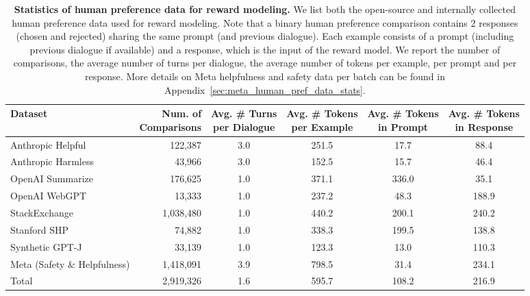 \documentclass{article}
\begin{document}
\begin{table}[ht]
  \centering
  \setlength{\tabcolsep}{4pt}
   {
  \begin{tabular}{@{}l@{\hspace*{0mm}}rcccc@{}}
    \toprule
     Dataset  & \shortstack[r]{Num. of \\ Comparisons} & \shortstack{ Avg. \# Turns \\ per Dialogue}  & \shortstack{Avg. \# Tokens \\ per Example} & \shortstack{Avg. \# Tokens \\in Prompt} & \shortstack{Avg. \# Tokens \\ in Response} \\
    \midrule
    Anthropic Helpful  & 122,387 & 3.0 & 251.5 & \phantom{0}17.7 & \phantom{0}88.4 \\
    Anthropic Harmless & 43,966 & 3.0 & 152.5 & \phantom{0}15.7 & \phantom{0}46.4 \\
    OpenAI Summarize   & 176,625 & 1.0 & 371.1 & 336.0 & \phantom{0}35.1 \\
    OpenAI WebGPT      & 13,333 & 1.0 & 237.2 & \phantom{0}48.3  & 188.9 \\
    StackExchange      & 1,038,480 & 1.0 & 440.2 & 200.1 & 240.2 \\
    Stanford SHP       & 74,882 & 1.0 & 338.3 & 199.5 & 138.8 \\
    Synthetic GPT-J    & 33,139 & 1.0 & 123.3 & \phantom{0}13.0 & 110.3 \\
    \midrule
    Meta (Safety \& Helpfulness) & 1,418,091 & 3.9 & 798.5 & \phantom{0}31.4 & 234.1 \\
    \midrule
    Total & 2,919,326 & 1.6 & 595.7 & 108.2 & 216.9 \\
    \bottomrule
  \end{tabular}}
  \vspace{0.3cm}
  \caption{\textbf{Statistics of human preference data for reward modeling.} We list both the open-source and internally collected human preference data used for reward modeling. Note that a binary human preference comparison contains 2 responses (chosen and rejected) sharing the same prompt (and previous dialogue). Each example consists of a prompt (including previous dialogue if available) and a response, which is the input of the reward model. We report the number of comparisons, the average number of turns per dialogue, the average number of tokens per example, per prompt and per response. More details on Meta helpfulness and safety data per batch can be found in Appendix~\ref{sec:meta_human_pref_data_stats}.
  \label{tab:rm_train_data}
  }
\end{table}
\end{document}
